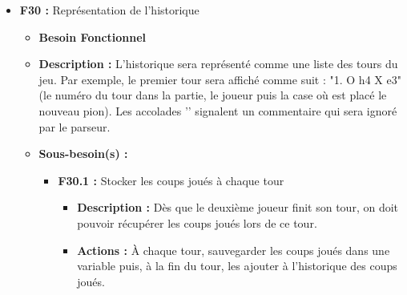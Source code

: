 \documentclass{article}
\begin{document}
\begin{itemize}
\begin{itemize}
\begin{itemize}
            \smallskip
            \item \textbf{F33.3 :} Quitter et sauvegarder
            \begin{itemize}
                \item \textbf{Description :} Lorsque l’utilisateur souhaite quitter la partie, le jeu lui demande s'il veut sauvegarder.
                \item \textbf{Prérequis :} quitter (\textbf{F33.1}), sauvegarder (\textbf{F33.2}), obtenir les commandes de l’utilisateur (\textbf{F26.1}), format de fichier (\textbf{F39}).
                \item \textbf{Actions :} Rajouter un appel à confirm pour demander si l’utilisateur veut quitter et sauvegarder. Si oui, avant de quitter, demander le chemin relatif, sauvegarder à l’emplacement spécifié et quitter, quitter sinon.
                \item \textbf{Tests :} Vérifier que, dans les 2 cas, avec ‘quit’, le programme renvoie 0 et vérifier que le fichier est correct avec ‘quit’, ‘y’ puis <path>.
            \end{itemize}
        \end{itemize}
    \end{itemize}
\bigskip
    \item \textbf{F30 :} Représentation de l’historique
    \begin{itemize}
        \item \textbf{Besoin Fonctionnel}
        \item \textbf{Description :} L’historique sera représenté comme une liste des tours du jeu. Par exemple, le premier tour sera affiché comme suit : "1. O h4 X e3" (le numéro du tour dans la partie, le joueur puis la case où est placé le nouveau pion). Les accolades ’{}’ signalent un commentaire qui sera ignoré par le parseur.
        \item \textbf{Sous-besoin(s) :}
        \begin{itemize}
            \smallskip
            \item \textbf{F30.1 :} Stocker les coups joués à chaque tour
            \begin{itemize}
                \item \textbf{Description :} Dès que le deuxième joueur finit son tour, on doit pouvoir récupérer les coups joués lors de ce tour.
                \item \textbf{Actions :}  À chaque tour, sauvegarder les coups joués dans une variable puis, à la fin du tour, les ajouter à l’historique des coups joués.

\end{itemize}
\end{itemize}
\end{itemize}
\end{itemize}
\end{document}
